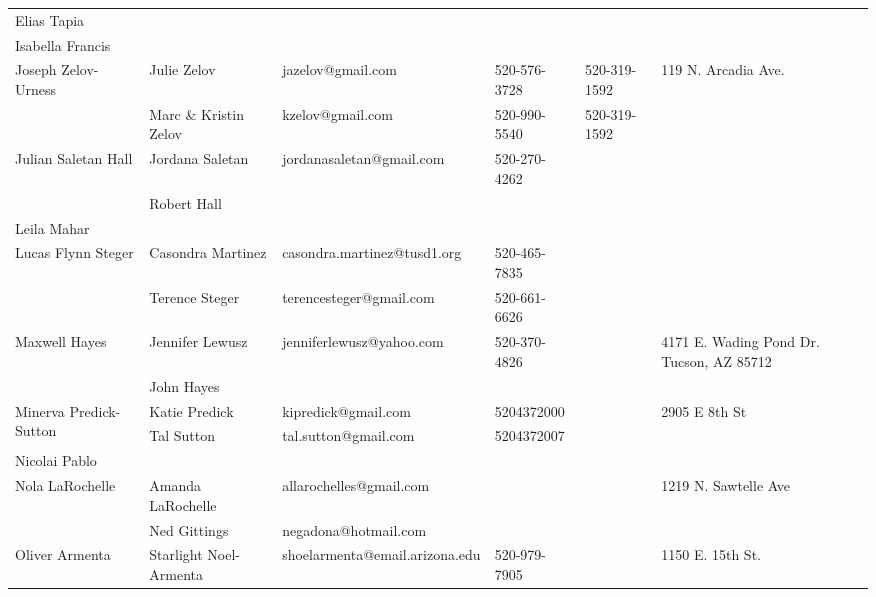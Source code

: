 \documentclass[landscape]{article}\usepackage[]{graphicx}\usepackage[]{color}
\begin{document}
\begin{longtable}{|p{100pt}|p{100pt}|p{140pt}|p{60pt}|p{64pt}|p{120pt}|}
 &  &  &  &  & \\
\hline
\multirow{2}{100pt}{Elias Tapia} &  &  &  &  & \multirow{2}{120pt}{} \\
 &  &  &  &  & \\
\hline
\multirow{2}{100pt}{Isabella Francis} &  &  &  &  & \multirow{2}{120pt}{} \\
 &  &  &  &  & \\
\hline
\multirow{2}{100pt}{Joseph Zelov-Urness} & Julie Zelov & jazelov@gmail.com & 520-576-3728 & 520-319-1592 & \multirow{2}{120pt}{119 N. Arcadia Ave.} \\
 & Marc \& Kristin Zelov & kzelov@gmail.com & 520-990-5540 & 520-319-1592 & \\
\hline
\multirow{2}{100pt}{Julian Saletan Hall} & Jordana Saletan & jordanasaletan@gmail.com & 520-270-4262 &  & \multirow{2}{120pt}{} \\
 & Robert Hall &  &  &  & \\
\hline
\multirow{2}{100pt}{Leila Mahar} &  &  &  &  & \multirow{2}{120pt}{} \\
 &  &  &  &  & \\
\hline
\multirow{2}{100pt}{Lucas Flynn Steger} & Casondra Martinez & casondra.martinez@tusd1.org & 520-465-7835 &  & \multirow{2}{120pt}{} \\
 & Terence Steger & terencesteger@gmail.com & 520-661-6626 &  & \\
\hline
\multirow{2}{100pt}{Maxwell Hayes} & Jennifer Lewusz & jenniferlewusz@yahoo.com & 520-370-4826 &  & \multirow{2}{120pt}{4171 E. Wading Pond Dr. Tucson, AZ 85712} \\
 & John Hayes &  &  &  & \\
\hline
\multirow{2}{100pt}{Minerva Predick-Sutton} & Katie Predick & kipredick@gmail.com & 5204372000 &  & \multirow{2}{120pt}{2905 E 8th St} \\
 & Tal Sutton & tal.sutton@gmail.com & 5204372007 &  & \\
\hline
\multirow{2}{100pt}{Nicolai Pablo} &  &  &  &  & \multirow{2}{120pt}{} \\
 &  &  &  &  & \\
\hline
\multirow{2}{100pt}{Nola LaRochelle} & Amanda LaRochelle & allarochelles@gmail.com &  &  & \multirow{2}{120pt}{1219 N. Sawtelle Ave} \\
 & Ned Gittings & negadona@hotmail.com &  &  & \\
\hline
\multirow{2}{100pt}{Oliver Armenta} & Starlight Noel-Armenta & shoelarmenta@email.arizona.edu & 520-979-7905 &  & \multirow{2}{120pt}{1150 E. 15th St.} \\

\end{longtable}
\end{document}

